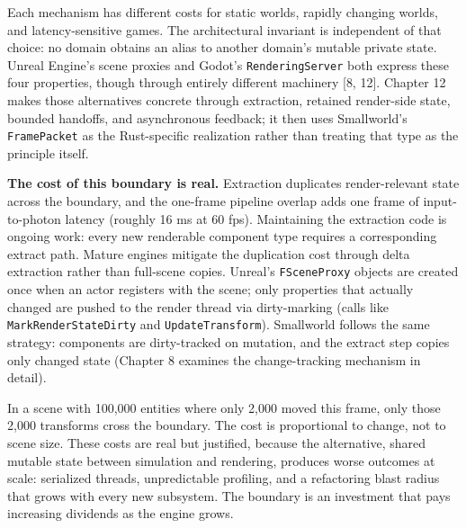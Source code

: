 \documentclass[
  11pt,
  letterpaper,
  DIV=11,
  numbers=noendperiod,
  twoside,
  open=right]{scrreprt}
\begin{document}
Each mechanism has different costs for static worlds, rapidly changing
worlds, and latency-sensitive games. The architectural invariant is
independent of that choice: no domain obtains an alias to another
domain's mutable private state. Unreal Engine's scene proxies and
Godot's \texttt{RenderingServer} both express these four properties,
though through entirely different machinery {[}8, 12{]}. Chapter 12
makes those alternatives concrete through extraction, retained
render-side state, bounded handoffs, and asynchronous feedback; it then
uses Smallworld's \texttt{FramePacket} as the Rust-specific realization
rather than treating that type as the principle itself.

\textbf{The cost of this boundary is real.} Extraction duplicates
render-relevant state across the boundary, and the one-frame pipeline
overlap adds one frame of input-to-photon latency (roughly 16 ms at 60
fps). Maintaining the extraction code is ongoing work: every new
renderable component type requires a corresponding extract path. Mature
engines mitigate the duplication cost through delta extraction rather
than full-scene copies. Unreal's \texttt{FSceneProxy} objects are
created once when an actor registers with the scene; only properties
that actually changed are pushed to the render thread via dirty-marking
(calls like \texttt{MarkRenderStateDirty} and \texttt{UpdateTransform}).
Smallworld follows the same strategy: components are dirty-tracked on
mutation, and the extract step copies only changed state (Chapter 8
examines the change-tracking mechanism in detail).

In a scene with 100,000 entities where only 2,000 moved this frame, only
those 2,000 transforms cross the boundary. The cost is proportional to
change, not to scene size. These costs are real but justified, because
the alternative, shared mutable state between simulation and rendering,
produces worse outcomes at scale: serialized threads, unpredictable
profiling, and a refactoring blast radius that grows with every new
subsystem. The boundary is an investment that pays increasing dividends
as the engine grows.
\end{document}
